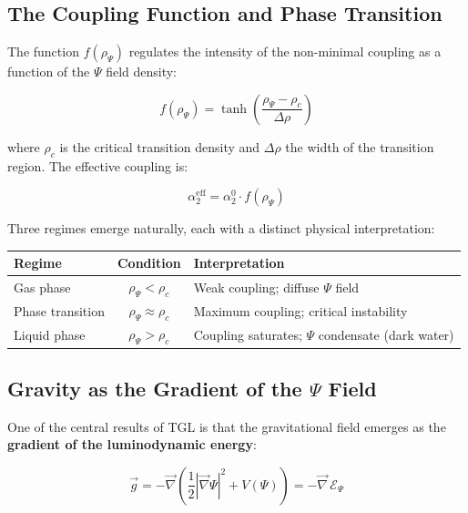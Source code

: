 \documentclass[12pt,a4paper,twoside]{article}
\newcommand{\Psifield}{\Psi}
\begin{document}
\subsection{The Coupling Function and Phase Transition}

The function $f(\rho_\Psifield)$ regulates the intensity of the non-minimal coupling as a function of the $\Psifield$ field density:

\begin{equation}
f(\rho_\Psifield) = \tanh\!\left(\frac{\rho_\Psifield - \rho_c}{\Delta\rho}\right)
\label{eq:coupling_function}
\end{equation}

\noindent where $\rho_c$ is the critical transition density and $\Delta\rho$ the width of the transition region. The effective coupling is:

\begin{equation}
\alpha_2^{\text{eff}} = \alpha_2^{0} \cdot f(\rho_\Psifield)
\label{eq:eff_coupling}
\end{equation}

Three regimes emerge naturally, each with a distinct physical interpretation:

\begin{center}
\begin{tabular}{lcl}
\toprule
\textbf{Regime} & \textbf{Condition} & \textbf{Interpretation} \\
\midrule
Gas phase & $\rho_\Psifield < \rho_c$ & Weak coupling; diffuse $\Psifield$ field \\
Phase transition & $\rho_\Psifield \approx \rho_c$ & Maximum coupling; critical instability \\
Liquid phase & $\rho_\Psifield > \rho_c$ & Coupling saturates; $\Psifield$ condensate (dark water) \\
\bottomrule
\end{tabular}
\end{center}



\subsection{Gravity as the Gradient of the $\Psifield$ Field}

One of the central results of TGL is that the gravitational field emerges as the \textbf{gradient of the luminodynamic energy}:

\begin{equationbox}[title={Luminodynamic Gravity}]
\begin{equation}
\boxed{\vec{g} = -\vec{\nabla}\!\left(\frac{1}{2}\left|\vec{\nabla}\Psifield\right|^2 + V(\Psifield)\right) = -\vec{\nabla}\,\mathcal{E}_\Psifield}
\label{eq:gravity_gradient}
\end{equation}
\end{equationbox}
\end{document}
